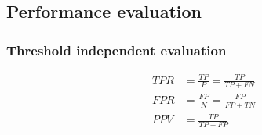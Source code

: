 \subsection{Performance evaluation}


\subsubsection{Threshold independent evaluation}


\begin{subequations}
\label{eq:TPR_FPR}
\begin{align}
\label{eq:TPR}
TPR &= \frac{TP}{P} = \frac{TP}{TP + FN}
\\
FPR &= \frac{FP}{N} = \frac{FP}{FP + TN}
\\
\label{eq:precision}
PPV &= \frac{TP}{TP + FP}
\end{align}
\end{subequations}

